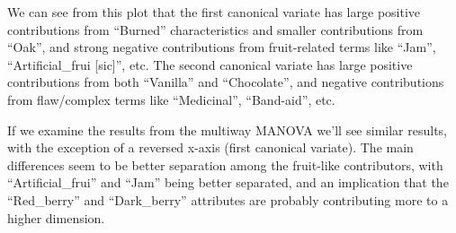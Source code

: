 \documentclass[
]{book}
\newenvironment{Shaded}{\begin{snugshade}}{\end{snugshade}}
\newcommand{\AttributeTok}[1]{\textcolor[rgb]{0.13,0.29,0.53}{#1}}
\newcommand{\DecValTok}[1]{\textcolor[rgb]{0.00,0.00,0.81}{#1}}
\newcommand{\FloatTok}[1]{\textcolor[rgb]{0.00,0.00,0.81}{#1}}
\newcommand{\FunctionTok}[1]{\textcolor[rgb]{0.13,0.29,0.53}{\textbf{#1}}}
\newcommand{\NormalTok}[1]{#1}
\newcommand{\SpecialCharTok}[1]{\textcolor[rgb]{0.81,0.36,0.00}{\textbf{#1}}}
\newcommand{\StringTok}[1]{\textcolor[rgb]{0.31,0.60,0.02}{#1}}
\begin{document}
We can see from this plot that the first canonical variate has large positive contributions from ``Burned'' characteristics and smaller contributions from ``Oak'', and strong negative contributions from fruit-related terms like ``Jam'', ``Artificial\_frui {[}sic{]}'', etc. The second canonical variate has large positive contributions from both ``Vanilla'' and ``Chocolate'', and negative contributions from flaw/complex terms like ``Medicinal'', ``Band-aid'', etc.

If we examine the results from the multiway MANOVA we'll see similar results, with the exception of a reversed x-axis (first canonical variate). The main differences seem to be better separation among the fruit-like contributors, with ``Artificial\_frui'' and ``Jam'' being better separated, and an implication that the ``Red\_berry'' and ``Dark\_berry'' attributes are probably contributing more to a higher dimension.

\begin{Shaded}
\end{Shaded}
\end{document}
